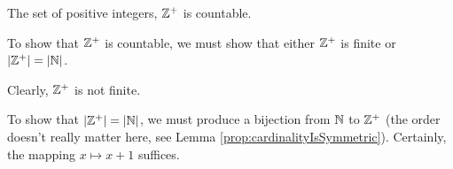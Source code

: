 \guard



\begin{exmp}
\label{exmp:positiveIntegersAreCountable}
  The set of positive integers, $\mathbb{Z}^+$ is countable.

  To show that $\mathbb{Z}^+$ is countable, we must show that either $\mathbb{Z}^+$ is finite or $\vert \mathbb{Z}^+\vert = \vert  \mathbb{N}\vert$.

  Clearly, $\mathbb{Z}^+$ is not finite.

  To show that $\vert\mathbb{Z}^+\vert = \vert\mathbb{N}\vert$, we must produce a bijection from $\mathbb{N}$ to $\mathbb{Z}^+$ (the order doesn't really matter here, see Lemma \ref{prop:cardinalityIsSymmetric}).
  Certainly, the mapping $x\mapsto x+1$ suffices.
\end{exmp}
